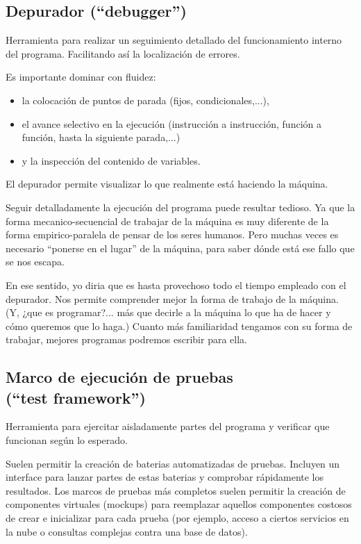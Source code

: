 \documentclass[spanish,12pt,a4paper,final,oneside]{book}
\begin{document}
\subsection{Depurador (``debugger'')}
Herramienta para realizar un seguimiento detallado del funcionamiento interno del programa. Facilitando así la localización de errores.

Es importante dominar con fluidez:
\begin{itemize}
\item la colocación de puntos de parada (fijos, condicionales,...), 
\item el avance selectivo en la ejecución (instrucción a instrucción, función a función, hasta la siguiente parada,...) 
\item y la inspección del contenido de variables.
\end{itemize}

El depurador permite visualizar lo que realmente está haciendo la máquina. 

Seguir detalladamente la ejecución del programa puede resultar tedioso. Ya que la forma mecanico-secuencial de trabajar de la máquina es muy diferente de la forma empirico-paralela de pensar de los seres humanos. Pero muchas veces es necesario ``ponerse en el lugar'' de la máquina, para saber dónde está ese fallo que se nos escapa.

En ese sentido, yo diria que es hasta provechoso todo el tiempo empleado con el depurador. Nos permite comprender mejor la forma de trabajo de la máquina. (Y, ¿que es programar?... más que decirle a la máquina lo que ha de hacer y cómo queremos que lo haga.) Cuanto más familiaridad tengamos con su forma de trabajar, mejores programas podremos escribir para ella.



\subsection{Marco de ejecución de pruebas\\(``test framework'')}
Herramienta para ejercitar aisladamente partes del programa y verificar que funcionan según lo esperado.

Suelen permitir la creación de baterias automatizadas de pruebas.  Incluyen un interface para lanzar partes de estas baterias y comprobar rápidamente los resultados. Los marcos de pruebas más completos suelen permitir la creación de componentes virtuales (mockups) para reemplazar aquellos componentes costosos de crear e inicializar para cada prueba (por ejemplo, acceso a ciertos servicios en la nube o consultas complejas contra una base de datos).
\end{document}
